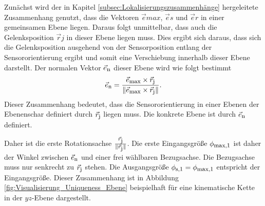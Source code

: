     Zunächst wird der in Kapitel \ref{subsec:Lokalisierungszusammenhänge} hergeleitete Zusammenhang genutzt, dass die Vektoren $\vec{e}{max}$, $\vec{e}{s}$ und $\vec{e}{r}$ in einer gemeinsamen Ebene liegen. Daraus folgt unmittelbar, dass auch die Gelenksposition $\vec{r}{j}$ in dieser Ebene liegen muss. Dies ergibt sich daraus, dass sich die Gelenksposition ausgehend von der Sensorposition entlang der Sensororientierung ergibt und somit eine Verschiebung innerhalb dieser Ebene darstellt. Der normalen Vektor $\vec{e}_{\textrm{\footnotesize{n}}}$ dieser Ebene wird wie folgt bestimmt
    \begin{equation}
        \vec{e}_{\textrm{\footnotesize{n}}} = \frac{\vec{e}_{\textrm{\footnotesize{max}}}\times \vec{r}_{\textrm{\footnotesize{j}}}}{\|\vec{e}_{\textrm{\footnotesize{max}}}\times \vec{r}_{\textrm{\footnotesize{j}}}\|}.
    \end{equation}
    Dieser Zusammenhang bedeutet, dass die Sensororientierung in einer Ebenen der Ebenenschar definiert durch $\vec{r}_{\textrm{\footnotesize{j}}}$ liegen muss. Die konkrete Ebene ist durch $\vec{e}_{\textrm{\footnotesize{n}}}$ definiert.
    
    Daher ist die erste Rotationsachse $\frac{\vec{r}_{\textrm{\footnotesize{j}}}}{\|\vec{r}_{\textrm{\footnotesize{j}}}\|}$. Die erste Eingangsgröße $\phi_{\textrm{\footnotesize{max,1}}}$ ist daher der Winkel zwischen $\vec{e}_{\textrm{\footnotesize{n}}}$ und einer frei wählbaren Bezugsachse. Die Bezugsachse muss nur senkrecht zu $\vec{r}_{\textrm{\footnotesize{j}}}$ stehen. Die Ausgangsgröße $\phi_{\textrm{\footnotesize{s,1}}} = \phi_{\textrm{\footnotesize{max,1}}}$ entspricht der Eingangsgröße.  Dieser Zusammenhang ist in Abbildung\,\ref{fig:Visualisierung_Uniqueness_Ebene} beispielhaft für eine kinematische Kette in der $yz$-Ebene dargestellt.
    
